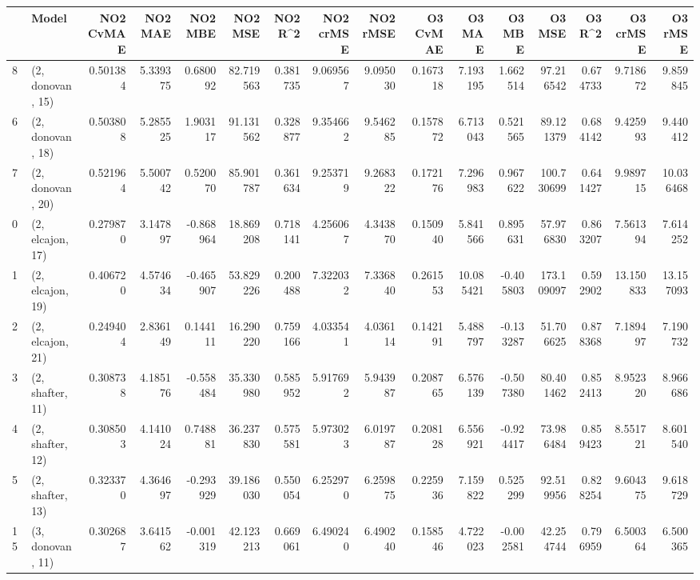 \begin{tabular}{llrrrrrrrrrrrrrr}
\toprule
{} &             Model &  NO2 CvMAE &   NO2 MAE &   NO2 MBE &    NO2 MSE &   NO2 R\textasciicircum2 &  NO2 crMSE &  NO2 rMSE &  O3 CvMAE &     O3 MAE &    O3 MBE &      O3 MSE &    O3 R\textasciicircum2 &   O3 crMSE &    O3 rMSE \\
\midrule
8  &  (2, donovan, 15) &   0.501384 &  5.339375 &  0.680092 &  82.719563 &  0.381735 &   9.069567 &  9.095030 &  0.167318 &   7.193195 &  1.662514 &   97.216542 &  0.674733 &   9.718672 &   9.859845 \\
6  &  (2, donovan, 18) &   0.503808 &  5.285525 &  1.903117 &  91.131562 &  0.328877 &   9.354662 &  9.546285 &  0.157872 &   6.713043 &  0.521565 &   89.121379 &  0.684142 &   9.425993 &   9.440412 \\
7  &  (2, donovan, 20) &   0.521964 &  5.500742 &  0.520070 &  85.901787 &  0.361634 &   9.253719 &  9.268322 &  0.172176 &   7.296983 &  0.967622 &  100.730699 &  0.641427 &   9.989715 &  10.036468 \\
0  &  (2, elcajon, 17) &   0.279870 &  3.147897 & -0.868964 &  18.869208 &  0.718141 &   4.256067 &  4.343870 &  0.150940 &   5.841566 &  0.895631 &   57.976830 &  0.863207 &   7.561394 &   7.614252 \\
1  &  (2, elcajon, 19) &   0.406720 &  4.574634 & -0.465907 &  53.829226 &  0.200488 &   7.322032 &  7.336840 &  0.261553 &  10.085421 & -0.405803 &  173.109097 &  0.592902 &  13.150833 &  13.157093 \\
2  &  (2, elcajon, 21) &   0.249404 &  2.836149 &  0.144111 &  16.290220 &  0.759166 &   4.033541 &  4.036114 &  0.142191 &   5.488797 & -0.133287 &   51.706625 &  0.878368 &   7.189497 &   7.190732 \\
3  &  (2, shafter, 11) &   0.308738 &  4.185176 & -0.558484 &  35.330980 &  0.585952 &   5.917692 &  5.943987 &  0.208765 &   6.576139 & -0.507380 &   80.401462 &  0.852413 &   8.952320 &   8.966686 \\
4  &  (2, shafter, 12) &   0.308503 &  4.141024 &  0.748881 &  36.237830 &  0.575581 &   5.973023 &  6.019787 &  0.208128 &   6.556921 & -0.924417 &   73.986484 &  0.859423 &   8.551721 &   8.601540 \\
5  &  (2, shafter, 13) &   0.323370 &  4.364697 & -0.293929 &  39.186030 &  0.550054 &   6.252970 &  6.259875 &  0.225936 &   7.159822 &  0.525299 &   92.519956 &  0.828254 &   9.604375 &   9.618729 \\
15 &  (3, donovan, 11) &   0.302687 &  3.641562 & -0.001319 &  42.123213 &  0.669061 &   6.490240 &  6.490240 &  0.158546 &   4.722023 & -0.002581 &   42.254744 &  0.796959 &   6.500364 &   6.500365 \\

\end{tabular}
